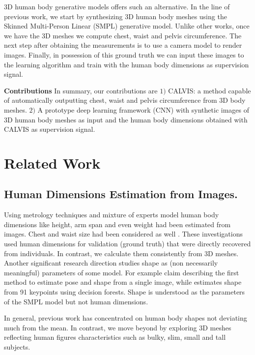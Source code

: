 \documentclass[runningheads, orivec]{llncs}
\begin{document}
3D human body generative models offers such an alternative. In the line of 
previous work, we start by synthesizing 3D human body meshes using the Skinned 
Multi-Person Linear (SMPL) \cite{Loper.2015} generative 
model. Unlike other works, once we have 
the 3D meshes we compute chest, waist and pelvis circumference. The next 
step after obtaining the 
measurements is to use a camera model to render
images. Finally, in possession of this ground truth we can 
input these images to the learning algorithm and train with the human body dimensions as supervision signal.

\textbf{Contributions} In summary, our contributions are $1)$ CALVIS: a method 
capable of automatically outputting chest, waist and pelvis circumference from 
3D body meshes. $2)$ A prototype deep learning framework (CNN) with synthetic 
images of 3D human body meshes as input and the human body dimensions obtained 
with CALVIS as supervision signal.

\section{Related Work} \label{sec:related_work}

\subsection{Human Dimensions Estimation from Images.}
Using metrology techniques \cite{ams.2008.BenAbdelkaderY08} and mixture of 
experts model \cite{Sigal.2008} human body dimensions like height, arm span and 
even weight had been estimated from images. Chest and waist size had been 
considered as well \cite{Guan.2013}. These investigations used human dimensions 
for validation (ground truth) that were directly recovered from individuals. In 
contrast, we calculate them  
consistently from 3D meshes.
Another significant research direction studies shape as (non necessarily meaningful) parameters of some model. For example \cite{Bogo:ECCV:2016} claim describing the first method 
to 
estimate pose and shape from a single image, while \cite{DBLP:Lassner2017} estimates shape from 91 keypoints using decision 
forests. Shape is understood as the 
parameters of the SMPL model but not human dimensions.

In general, previous work has concentrated on human body shapes not deviating 
much from the mean. In contrast, we move beyond by exploring 3D meshes 
reflecting human figures characteristics such as bulky, slim, small and 
tall subjects.
\end{document}
